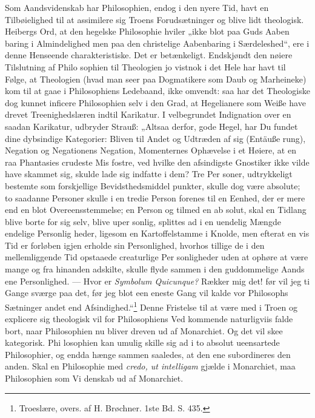 \documentclass[12pt]{book}
\newcommand{\opage}[1]{\marginnote{\footnotesize\textit{[#1]}}}
\begin{document}
Som Aandsvidenskab har Philosophien, endog i den
nyere Tid, havt en Tilbøielighed til at assimilere sig Troens
Forudsætninger og blive lidt theologisk. Heibergs Ord, at
den hegelske Philosophie hviler „ikke blot paa Guds Aaben\-%
baring i Almindelighed men paa den christelige Aabenbaring
i Særdeleshed“, ere i denne Henseende charakteristiske. Det
er betænkeligt. Endskjøndt den nøiere Tilslutning af Philo\-%
sophien til Theologien jo vistnok i det Hele har havt til Følge,
at Theologien (hvad man seer paa Dogmatikere som Daub
og Marheineke) kom til at gaae i Philosophiens Ledebaand,
ikke omvendt: saa har det Theologiske dog kunnet inficere
Philosophien selv i den Grad, at Hegelianere som Weiße have
drevet Treenighedslæren indtil Karikatur. I velbegrundet
Indignation over en saadan Karikatur, udbryder Strauß:
„Altsaa derfor, gode Hegel, har Du fundet dine dybsindige
Kategorier: Bliven til Andet og Udtræden af sig (Entäuße\-%
rung), Negation og Negationens Negation, Momenternes
Ophævelse i et Høiere, at en raa Phantasies crudeste Mis\-%
fostre, ved hvilke den afsindigste Gnostiker ikke vilde have
skammet sig, skulde lade sig indfatte i dem? Tre Per\-%
soner, udtrykkeligt bestemte som forskjellige Bevidsthedsmiddel\-%
punkter, skulle dog være absolute; to saadanne Personer skulle
i en tredie Person forenes til en Eenhed, der er mere end
en blot Overeensstemmelse; en Person og tilmed en ab\-%
\opage{110}\setcounter{footnote}{0}%
solut, skal en Tidlang blive borte for sig selv, blive uper\-%
sonlig, splittes ad i en uendelig Mængde endelige Personlig\-%
heder, ligesom en Kartoffelstamme i Knolde, men efterat en
vis Tid er forløben igjen erholde sin Personlighed, hvorhos
tillige de i den mellemliggende Tid opstaaede creaturlige Per\-%
sonligheder uden at ophøre at være mange og fra hinanden
adskilte, skulle flyde sammen i den guddommelige Aands ene
Personlighed. --- Hvor er \textit{Symbolum Quicunque?} Rækker
mig det! før vil jeg ti Gange sværge paa det, før jeg blot
een eneste Gang vil kalde vor Philosophs Sætninger andet
end Afsindighed.“\footnote{Troeslære, overs. af H. Brøchner. 1ste Bd. S. 435.}
Denne Fristelse til at være med i
Troen og explicere sig theologisk vil for Philosophiens Ved\-%
kommende naturligviis falde bort, naar Philosophien nu bliver
dreven ud af Monarchiet. Og det vil skee kategorisk. Phi\-%
losophien kan umulig skille sig ad i to absolut ueensartede
Philosophier, og endda hænge sammen saaledes, at den ene
subordineres den anden. Skal en Philosophie med \textit{credo, ut
intelligam} gjælde i Monarchiet, maa Philosophien som Vi\-%
denskab ud af Monarchiet.
\end{document}

